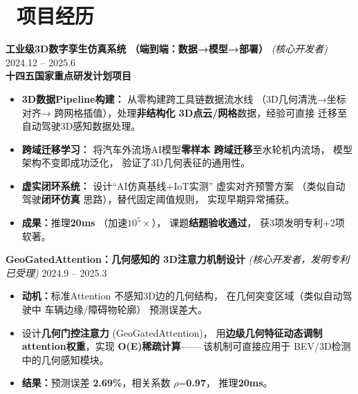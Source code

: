 \documentclass[11pt]{article}
\newlength{\interProjectSpacing}
\newcommand{\projectsep}{\vspace{\interProjectSpacing}}
\begin{document}
\section{\makebox[\widthof{\faBriefcase}][c]{\color{CVBlue}%
\faBriefcase}\ 项目经历}

\textbf{工业级3D数字孪生仿真系统
（端到端：数据→模型→部署）} 
\textit{(核心开发者)} \hfill 2024.12 -- 2025.6
\\[0.2em]
\textcolor{CVBlue}{\textbf{十四五国家重点研发计划项目}}
\begin{itemize}
    \item \textbf{3D数据Pipeline构建：}
    从零构建跨工具链数据流水线
    （3D几何清洗→坐标对齐→
    跨网格插值），处理\textbf{非结构化
    3D点云/网格}数据，经验可直接
    迁移至自动驾驶3D感知数据处理。
    
    \item \textbf{跨域迁移学习：}
    将汽车外流场AI模型\textbf{零样本
    跨域迁移}至水轮机内流场，
    模型架构不变即成功泛化，
    验证了3D几何表征的通用性。
    
    \item \textbf{虚实闭环系统：}
    设计``AI仿真基线+IoT实测''
    虚实对齐预警方案
    （类似自动驾驶\textbf{闭环仿真}
    思路），替代固定阈值规则，
    实现早期异常捕获。
    
    \item \textbf{成果：}推理\textbf{20ms}
    （加速$10^5\times$），
    课题\textbf{结题验收通过}，
    获3项发明专利+2项软著。
\end{itemize}

\projectsep

\textbf{GeoGatedAttention：几何感知的
3D注意力机制设计} 
\textit{(核心开发者，发明专利已受理)} 
\hfill 2024.9 -- 2025.3
\begin{itemize}
    \item \textbf{动机：}标准Attention
    不感知3D边的几何结构，
    在几何突变区域（类似自动驾驶中
    车辆边缘/障碍物轮廓）
    预测误差大。
    
    \item 设计\textbf{几何门控注意力}
    (GeoGatedAttention)，
    用\textbf{边级几何特征动态调制
    attention权重}，实现
    \textbf{O(E)稀疏计算}——
    该机制可直接应用于
    BEV/3D检测中的几何感知模块。
    
    \item \textbf{结果：}预测误差
    \textbf{2.69\%}，相关系数
    $\rho$=\textbf{0.97}，
    推理\textbf{20ms}。
\end{itemize}
\end{document}
